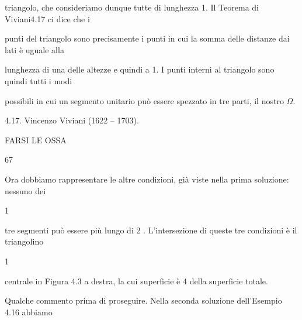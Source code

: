 \documentclass[a4paper,portrait,12pt]{article}
\begin{document}
\begin{flushleft}
triangolo, che consideriamo dunque tutte di lunghezza 1. Il Teorema di Viviani4.17 ci dice che i
\end{flushleft}


\begin{flushleft}
punti del triangolo sono precisamente i punti in cui la somma delle distanze dai lati \`{e} uguale alla
\end{flushleft}


\begin{flushleft}
lunghezza di una delle altezze e quindi a 1. I punti interni al triangolo sono quindi tutti i modi
\end{flushleft}


\begin{flushleft}
possibili in cui un segmento unitario pu\`{o} essere spezzato in tre parti, il nostro $\Omega$.
\end{flushleft}


\begin{flushleft}
4.17. Vincenzo Viviani (1622 -- 1703).
\end{flushleft}





\begin{flushleft}
 FARSI LE OSSA
\end{flushleft}





67





\begin{flushleft}
Ora dobbiamo rappresentare le altre condizioni, gi\`{a} viste nella prima soluzione: nessuno dei
\end{flushleft}


1


\begin{flushleft}
tre segmenti pu\`{o} essere più lungo di 2 . L'intersezione di queste tre condizioni \`{e} il triangolino
\end{flushleft}


1


\begin{flushleft}
centrale in Figura 4.3 a destra, la cui superficie \`{e} 4 della superficie totale.
\end{flushleft}


\begin{flushleft}
Qualche commento prima di proseguire. Nella seconda soluzione dell'Esempio 4.16 abbiamo
\end{flushleft}
\end{document}
